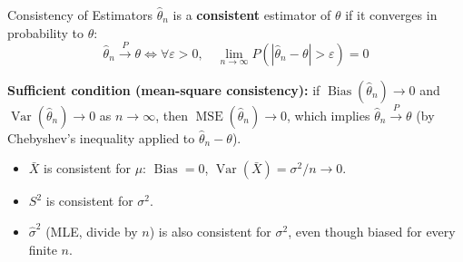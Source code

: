 \documentclass[11pt,aspectratio=169]{beamer}
\newcommand{\Var}{\operatorname{Var}}
\newcommand{\Bias}{\operatorname{Bias}}
\newcommand{\MSE}{\operatorname{MSE}}
\newcommand{\Xbar}{\bar{X}}
\begin{document}
\begin{frame}{Consistency of Estimators}
$\hat\theta_n$ is a \textbf{consistent} estimator of $\theta$ if it
converges in probability to $\theta$:
\[
    \hat\theta_n \xrightarrow{P} \theta
    \iff
    \forall \varepsilon>0,\quad \lim_{n\to\infty} P(|\hat\theta_n-\theta|>\varepsilon)=0
\]

\textbf{Sufficient condition (mean-square consistency):} if
$\Bias(\hat\theta_n)\to 0$ and $\Var(\hat\theta_n)\to 0$ as $n\to\infty$,
then $\MSE(\hat\theta_n)\to 0$, which implies $\hat\theta_n
\xrightarrow{P}\theta$ (by Chebyshev's inequality applied to
$\hat\theta_n - \theta$).

\begin{itemize}
    \item $\Xbar$ is consistent for $\mu$: $\Bias=0$,
          $\Var(\Xbar)=\sigma^2/n\to 0$.
    \item $S^2$ is consistent for $\sigma^2$.
    \item $\hat\sigma^2$ (MLE, divide by $n$) is also consistent for
          $\sigma^2$, even though biased for every finite $n$.
\end{itemize}
\end{frame}
\end{document}
